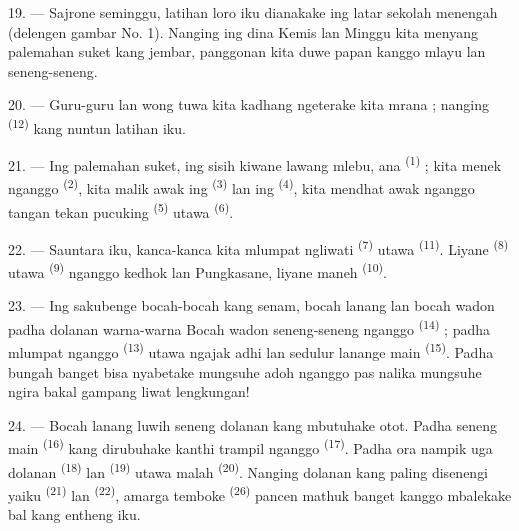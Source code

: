 19. --- Sajrone seminggu, latihan loro iku dianakake ing latar sekolah
menengah (delengen gambar No. 1). Nanging ing dina Kemis lan Minggu
kita menyang palemahan suket kang jembar, panggonan kita duwe papan
kanggo mlayu lan seneng-seneng.

20. --- Guru-guru lan wong tuwa kita kadhang ngeterake kita mrana ;
nanging \textsuperscript{(12)} kang nuntun latihan iku.

21. --- Ing palemahan suket, ing sisih kiwane lawang mlebu, ana
\textsuperscript{(1)} ; kita menek nganggo
\textsuperscript{(2)}, kita malik awak ing \textsuperscript{(3)} lan ing \textsuperscript{(4)},
kita mendhat awak nganggo tangan tekan pucuking \textsuperscript{(5)} utawa \textsuperscript{(6)}.

22. --- Sauntara iku, kanca-kanca kita mlumpat ngliwati \textsuperscript{(7)} utawa \textsuperscript{(11)}.
Liyane \textsuperscript{(8)} utawa \textsuperscript{(9)}
nganggo kedhok lan  Pungkasane, liyane maneh
\textsuperscript{(10)}.

\VUsaut{4.6mm}
\VUsaut{3.0mm}

23. --- Ing sakubenge bocah-bocah kang senam, bocah lanang lan bocah
wadon padha dolanan warna-warna  Bocah wadon
seneng-seneng nganggo \textsuperscript{(14)} ; padha
mlumpat nganggo \textsuperscript{(13)} utawa ngajak adhi lan
sedulur lanange main \textsuperscript{(15)}. Padha bungah
banget bisa nyabetake  mungsuhe adoh nganggo  pas nalika mungsuhe ngira bakal gampang liwat lengkungan!

24. --- Bocah lanang luwih seneng dolanan kang mbutuhake otot. Padha
seneng main \textsuperscript{(16)} kang dirubuhake kanthi
trampil nganggo \textsuperscript{(17)}. Padha ora nampik uga
dolanan \textsuperscript{(18)} lan
\textsuperscript{(19)} utawa malah \textsuperscript{(20)}. Nanging dolanan kang paling disenengi yaiku
\textsuperscript{(21)} lan \textsuperscript{(22)},
amarga temboke \textsuperscript{(26)} pancen mathuk banget
kanggo mbalekake bal kang entheng iku.

